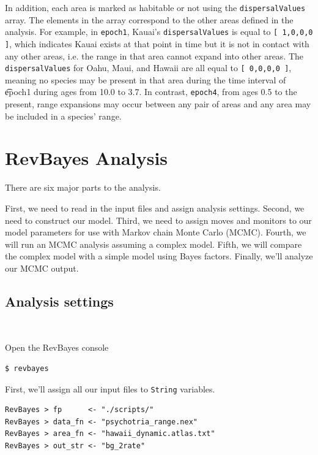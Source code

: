 \documentclass[11pt]{article}
\newcommand{\impmark}{\strut\vadjust{\domark}}
\newcommand{\domark}{%
  \vbox to 0pt{
    \kern-\dp\strutbox
    \smash{\llap{$\rightarrow$\kern1em}}
    \vss
  }%
}
\begin{document}
In addition, each area is marked as habitable or not using the {\tt dispersalValues} array.
The elements in the array correspond to the other areas defined in the analysis.
For example, in {\tt epoch1}, Kauai's {\tt dispersalValues} is equal to {\tt [ 1,0,0,0 ]}, which indicates Kauai exists at that point in time but it is not in contact with any other areas, i.e. the range in that area cannot expand into other areas.
The {\tt dispersalValues} for Oahu, Maui, and Hawaii are all equal to {\tt [ 0,0,0,0 ]}, meaning no species may be present in that area during the time interval of {\t epoch1} during ages from 10.0 to 3.7. In contrast, {\tt epoch4}, from ages 0.5 to the present, range expansions may occur between any pair of areas and any area may be included in a species' range.

\section{RevBayes Analysis}

There are six major parts to the analysis.

First, we need to read in the input files and assign analysis settings.
Second, we need to construct our model.
Third, we need to assign moves and monitors to our model parameters for use with Markov chain Monte Carlo (MCMC).
Fourth, we will run an MCMC analysis assuming a complex model.
Fifth, we will compare the complex model with a simple model using Bayes factors.
Finally, we'll analyze our MCMC output.

\subsection{Analysis settings}

\setlength{\parindent}{0pt}

\noindent \\ \impmark Open the RevBayes console

\begin{snugshade}
\begin{lstlisting}
$ revbayes
\end{lstlisting}
\end{snugshade}

First, we'll assign all our input files to {\tt String} variables.
\begin{snugshade}
\begin{lstlisting}
RevBayes > fp      <- "./scripts/"
RevBayes > data_fn <- "psychotria_range.nex"
RevBayes > area_fn <- "hawaii_dynamic.atlas.txt"
RevBayes > out_str <- "bg_2rate"
\end{lstlisting}
\end{snugshade}
\end{document}
